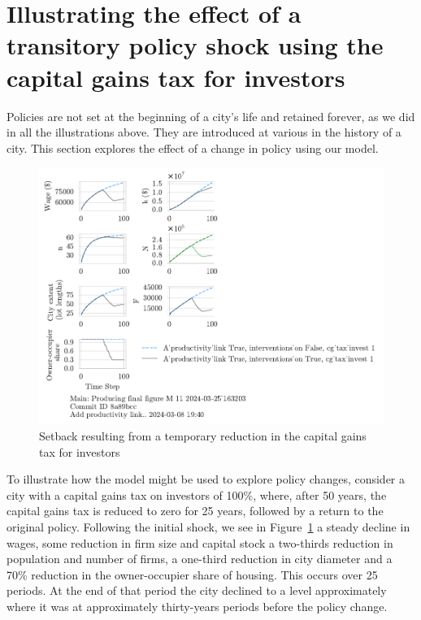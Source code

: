 {\newpage

\section{Illustrating the effect of a transitory policy shock using  the capital gains tax for investors}
Policies are not set at the beginning of a city's life and retained forever, as we did in all the illustrations above. They are introduced at various in the history of a city. This section explores the effect of a change in policy using our model.

\begin{figure}[h!tb] 
    \centering
    \includegraphics[scale=1., trim={0 1.4cm 7cm 0},clip]{fig/interventions_on-cg_tax_invest-163203.pdf}  %
    \caption{Setback resulting from a temporary reduction in the capital gains tax for investors}
    \label{fig:cgtax_setback}
\end{figure}


To illustrate how the model might be used to explore policy changes, consider a city with a capital gains tax on investors of 100\%, where, after 50 years, the capital gains tax is reduced to zero for 25 years, followed by a return to the original policy. Following the initial shock, we see in Figure~\ref{fig:cgtax_setback} a steady decline in wages, some reduction in firm size and capital stock a two-thirds reduction in population and number of firms,  a one-third reduction in city diameter and a 70\% reduction in the owner-occupier share of housing. This occurs over 25 periods.  At the end of that period the city declined to a level approximately where it was at approximately thirty-years periods before the policy change.

}
